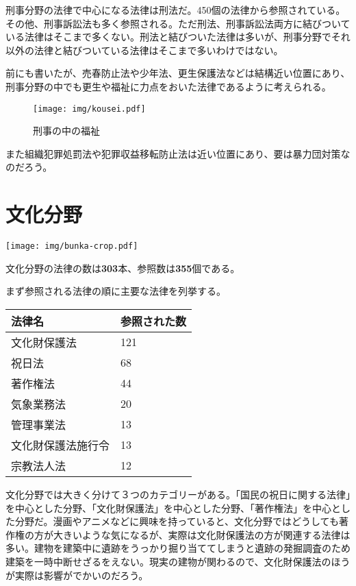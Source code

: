 \documentclass[a5j,openany,twoside]{jsbook}
\begin{document}
刑事分野の法律で中心になる法律は刑法だ。450個の法律から参照されている。その他、刑事訴訟法も多く参照される。ただ刑法、刑事訴訟法両方に結びついている法律はそこまで多くない。刑法と結びついた法律は多いが、刑事分野でそれ以外の法律と結びついている法律はそこまで多いわけではない。

前にも書いたが、売春防止法や少年法、更生保護法などは結構近い位置にあり、刑事分野の中でも更生や福祉に力点をおいた法律であるように考えられる。

\begin{wrapfigure}{l}{35mm}
 \begin{center}
  \texttt{[image: img/kousei.pdf]}
  \caption{刑事の中の福祉}
 \end{center}
\end{wrapfigure}

また組織犯罪処罰法や犯罪収益移転防止法は近い位置にあり、要は暴力団対策なのだろう。

\section{文化分野}

\texttt{[image: img/bunka-crop.pdf]}

文化分野の法律の数は\textbf{303}本、参照数は\textbf{355}個である。

まず参照される法律の順に主要な法律を列挙する。

\begin{table}[htb]
  \begin{tabular}{|l|l|}  \hline
法律名 & 参照された数 \\ \hline \hline
文化財保護法 & 121 \\
祝日法 & 68 \\
著作権法 & 44 \\
気象業務法 & 20 \\
管理事業法 & 13 \\
文化財保護法施行令 & 13 \\
宗教法人法 & 12 \\ \hline
  \end{tabular}
\end{table}

文化分野では大きく分けて３つのカテゴリーがある。「国民の祝日に関する法律」を中心とした分野、「文化財保護法」を中心とした分野、「著作権法」を中心とした分野だ。漫画やアニメなどに興味を持っていると、文化分野ではどうしても著作権の方が大きいような気になるが、実際は文化財保護法の方が関連する法律は多い。建物を建築中に遺跡をうっかり掘り当ててしまうと遺跡の発掘調査のため建築を一時中断せざるをえない。現実の建物が関わるので、文化財保護法のほうが実際は影響がでかいのだろう。
\end{document}
